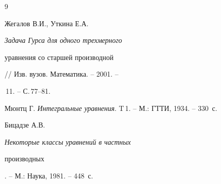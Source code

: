 \begin{thebibliography}{9}


Жегалов В.И., Уткина Е.А. {\em Задача Гурса для одного трехмерного 


уравнения со старшей производной} // Изв. вузов. Математика. -- 2001. -- 


\No\,11. -- С.\,77--81. 




Мюнтц Г. {\em Интегральные уравнения}. T\,1. -- М.: ГТТИ, 1934. -- 330~с. 




Бицадзе А.В. {\em Некоторые классы уравнений в частных 


производных}. -- М.: Наука, 1981. -- 448~с. 


 


\end{thebibliography} 


 


\vskip 2cm 


 






 


\label{end} 


 



